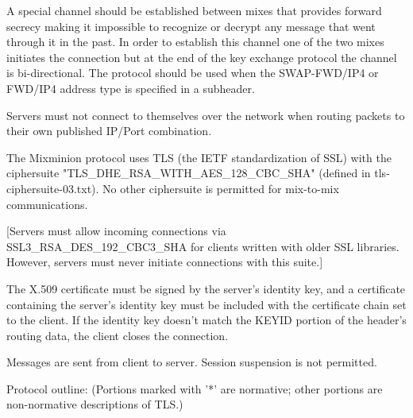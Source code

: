 A special channel should be established between mixes that provides
forward secrecy making it impossible to recognize or decrypt any
message that went through it in the past. In order to establish this
channel one of the two mixes initiates the connection but at the end
of the key exchange protocol the channel is bi-directional. The
protocol should be used when the SWAP-FWD/IP4 or FWD/IP4 address type
is specified in a subheader.

Servers must not connect to themselves over the network when routing
packets to their own published IP/Port combination.

The Mixminion protocol uses TLS (the IETF standardization of SSL) with
the ciphersuite "TLS_DHE_RSA_WITH_AES_128_CBC_SHA" (defined in
tls-ciphersuite-03.txt).  No other ciphersuite is permitted for
mix-to-mix communications.

[Servers must allow incoming connections via SSL3_RSA_DES_192_CBC3_SHA
for clients written with older SSL libraries.  However, servers must
never initiate connections with this suite.]

The X.509 certificate must be signed by the server's identity
key, and a certificate containing the server's identity key must be
included with the certificate chain set to the client.  If the
identity key doesn't match the KEYID portion of the  header's routing
data, the client closes the connection.

Messages are sent from client to server.  Session suspension is not
permitted.

Protocol outline: (Portions marked with '*' are normative; other
portions are non-normative descriptions of TLS.)

